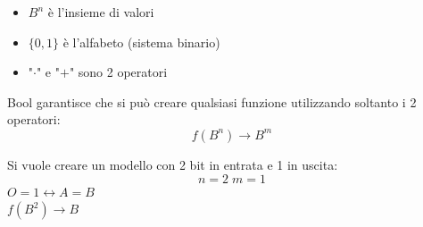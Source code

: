 \documentclass[a4paper]{article}
\theoremstyle{break}
\theoremstyle{break}
\theoremstyle{break}
\theoremstyle{break}
\begin{document}
\begin{itemize}
	\item \( B^n \) è l'insieme di valori
	\item \( \{0,1\} \) è l'alfabeto (sistema binario)
	\item "\( \cdot  \)" e "\( + \)" sono 2 operatori
\end{itemize}
Bool garantisce che si può creare qualsiasi funzione utilizzando soltanto i
2 operatori:
\[
	f(B^n) \to B^m
\]
\begin{example}
	Si vuole creare un modello con 2 bit in entrata e 1 in uscita:
	\[
		n=2 \; m=1
	\]
	\( O=1 \leftrightarrow A=B \)\\
	\( f(B^2) \to B \)
    \begin{figure}[H]
        \begin{center}
\end{center}
\end{figure}
\end{example}
\end{document}
